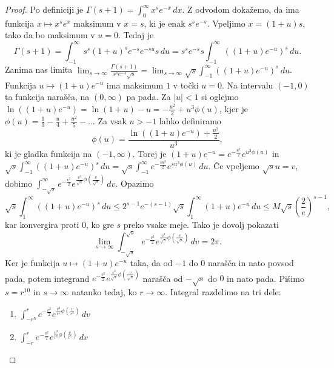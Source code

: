 \documentclass[10pt, a4paper]{article}
\newenvironment{noticeC}{%
  \tcolorbox[%
  notitle,
  empty,
  enhanced,  %
  breakable,
  coltext=black, 
  fontupper=\rmfamily,
  parbox=false,
  noparskip,
  sharp corners,
  boxrule=-1pt,  %
  frame hidden,
  left=7pt,  %
  right=7pt,
  top=5pt,
  bottom=5pt,
  before skip=2.5ex plus 2pt,
  after skip=2.5ex plus 2pt,
  overlay unbroken and last={%
  },
  ]}
{\endtcolorbox}
\newenvironment{dokaz}%
  {\begin{noticeC}\begin{proof}}%
  {\end{proof}\end{noticeC}}
\begin{document}
\begin{dokaz}
    Po definiciji je $\Gamma (s + 1) = \int_0 ^\infty x^s e^{-x}\, dx$.
    Z odvodom dokažemo, da ima funkcija $x \mapsto x^s e^x$ maksimum v $x = s$, ki je enak $s^s e^{-s}$.
    Vpeljimo $x = (1 + u) s$, tako da bo maksimum v $u = 0$.
    Tedaj je 
    $$\Gamma (s + 1) = \int_{-1} ^\infty s^s (1 + u)^s e^{-s} e^{-su} s\, du = s^s e^{-s} s \int_{-1} ^\infty \left((1 + u)e^{-u}\right)^s \, du.$$
    Zanima nas limita $\lim_{s \to \infty} \frac{\Gamma(s + 1)}{s^s e^{-s} \sqrt{s}} = \lim_{s \to \infty} \sqrt{s} \int_{-1} ^\infty \left((1 + u) e^{-u}\right)^s\, du$.
    Funkcija $u \mapsto (1 + u) e^{-u}$ ima maksimum $1$ v točki $u = 0$.
    Na intervalu $(-1, 0)$ ta funkcija narašča, na $(0, \infty)$ pa pada.
    Za $|u| < 1$ si oglejmo $\ln ((1 + u) e^{-u}) = \ln(1 + u) - u = -\frac{u^2}{2} + u^3 \phi(u)$,
    kjer je $\phi(u) = \frac{1}{3} - \frac{u}{4} + \frac{u^2}{5} - \dots$
    Za vsak $u > -1$ lahko definiramo 
    $$\phi(u) = \frac{\ln((1 + u)e^{-u}) + \frac{u^2}{2}}{u^3},$$
    ki je gladka funkcija na $(-1, \infty)$. Torej je $(1 + u)e^{-u} = e^{-\frac{u^2}{2}} e^{u^3 \phi(u)}$ in 
    $\sqrt{s} \int_{-1} ^\infty \left((1 + u) e^{-u}\right)^s\, du = \sqrt{s} \int_{-1} ^\infty e^{-\frac{su^2}{2}} e^{su^3 \phi(u)} \, du$.
    Če vpeljemo $\sqrt{s} u = v$, dobimo $\int_{-\sqrt{s}} ^\infty e^{-\frac{v^2}{2}} e^{\frac{v^3}{\sqrt{s}} \phi\left(\frac{v}{\sqrt{s}}\right)}\, dv$.
    Opazimo $$\sqrt{s} \int_{1} ^\infty \left((1 + u) e^{-u}\right)^s\, du \leq 2^{s - 1} e^{-(s-1)} \sqrt{s} \int_{1} ^\infty (1 + u) e^{-u}\, du \leq M \sqrt{s} \left(\frac{2}{e}\right)^{s - 1},$$
    kar konvergira proti $0$, ko gre $s$ preko vsake meje. Tako je dovolj pokazati 
    $$\lim_{s \to \infty} \int_{-\sqrt{s}} ^{\sqrt{s}} e^{-\frac{v^2}{2}} e^{\frac{v^3}{\sqrt{s}} \phi\left(\frac{v}{\sqrt{s}}\right)} \, dv = 2 \pi.$$
    Ker je funkcija $u \mapsto (1 + u) e^{-u}$ taka, da od $-1$ do $0$ narašča in nato povsod pada,
    potem integrand $e^{-\frac{v^2}{2}} e^{\frac{v^3}{\sqrt{s}} \phi\left(\frac{v}{\sqrt{s}}\right)}$ narašča od $- \sqrt{s}$ do $0$ in nato pada.
    Pišimo $s = r^{10}$ in $s \to \infty$ natanko tedaj, ko $r \to \infty$.
    Integral razdelimo na tri dele:
    \begin{enumerate}
        \item $\int_{-r^5} ^r e^{-\frac{v^2}{2}} e^{\frac{v^3}{r^5} \phi\left(\frac{v}{r^5}\right)} \, dv$
        \item $\int_{-r} ^{r} e^{-\frac{v^2}{2}} e^{\frac{v^3}{r^5} \phi\left(\frac{v}{r^5}\right)} \, dv$

\end{enumerate}
\end{dokaz}
\end{document}

